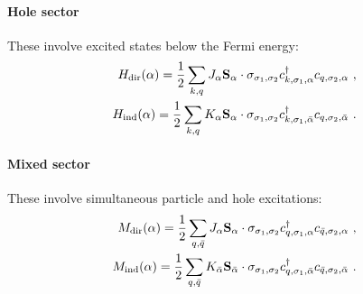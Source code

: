 \paragraph{Hole sector}
These involve excited states below the Fermi energy:
\begin{equation}\begin{aligned}
	H_\text{dir}(\alpha) = \frac{1}{2}\sum_{k, q} J_\alpha {\bf S}_\alpha \cdot {\bf \sigma}_{\sigma_1,\sigma_2} c^\dagger_{k,\sigma_1, \alpha}c_{q,\sigma_2, \alpha}~,\\
	H_\text{ind}(\alpha) = \frac{1}{2}\sum_{k, q} K_{\alpha} {\bf S}_{\alpha} \cdot {\bf \sigma}_{\sigma_1,\sigma_2} c^\dagger_{k,\sigma_1, \bar\alpha}c_{q,\sigma_2, \bar\alpha}~.
\end{aligned}\end{equation}
\paragraph{Mixed sector}
These involve simultaneous particle and hole excitations:
\begin{equation}\begin{aligned}
	M_\text{dir}(\alpha) = \frac{1}{2}\sum_{q, \bar q} J_\alpha {\bf S}_\alpha \cdot {\bf \sigma}_{\sigma_1,\sigma_2} c^\dagger_{q,\sigma_1, \alpha}c_{\bar q,\sigma_2, \alpha}~,\\
	M_\text{ind}(\alpha) = \frac{1}{2}\sum_{q, \bar q} K_{\bar\alpha} {\bf S}_{\bar\alpha} \cdot {\bf \sigma}_{\sigma_1,\sigma_2} c^\dagger_{q,\sigma_1, \bar\alpha}c_{\bar q,\sigma_2, \bar\alpha}~.
\end{aligned}\end{equation}

